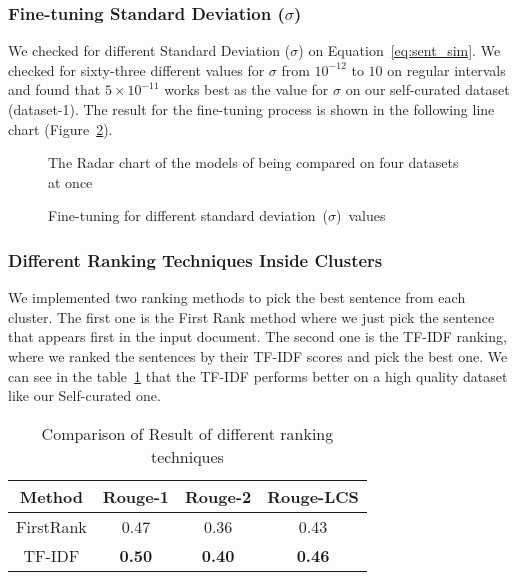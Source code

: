 \subsubsection{Fine-tuning Standard Deviation ($\sigma$)}\label{subsubsec:sigma}
We checked for different Standard Deviation ($\sigma$) on Equation~\ref{eq:sent_sim}. We checked for sixty-three different values for $\sigma$ from $10^{-12}$ to $10$ on regular intervals and found that $5\times10^{-11}$ works best as the value for $\sigma$ on our self-curated dataset (dataset-1). The result for the fine-tuning process is shown in the following line chart (Figure~\ref{fig:sigma-fine-tuning}).

\begin{figure}[]
    \centering
    
    \caption{The Radar chart of the models of being compared on four datasets at once}
    \label{fig:radarchart}
\end{figure}
\begin{figure}
    \centering
    
    \caption{Fine-tuning for different standard deviation~($\sigma$)~values}
    \label{fig:sigma-fine-tuning}
\end{figure}

\subsubsection{Different Ranking Techniques Inside Clusters}\label{subsubsec:different-ranking-techniques-inside-clusters}
We implemented two ranking methods to pick the best sentence from each cluster. The first one is the First Rank method where we just pick the sentence that appears first in the input document. The second one is the TF-IDF ranking, where we ranked the sentences by their TF-IDF scores and pick the best one. We can see in the table~\ref{tab:ranking} that the TF-IDF performs better on a high quality dataset like our Self-curated one.

\begin{table}[]
    \centering
    \begin{tabular}{cccc}\hline
        Method      & Rouge-1       & Rouge-2       & Rouge-LCS     \\\hline
        FirstRank   & 0.47          & 0.36          & 0.43          \\
        TF-IDF      & \textbf{0.50} & \textbf{0.40} & \textbf{0.46} \\\hline
    \end{tabular}
    \caption{Comparison of Result of different ranking techniques}
    \label{tab:ranking}
\end{table}

